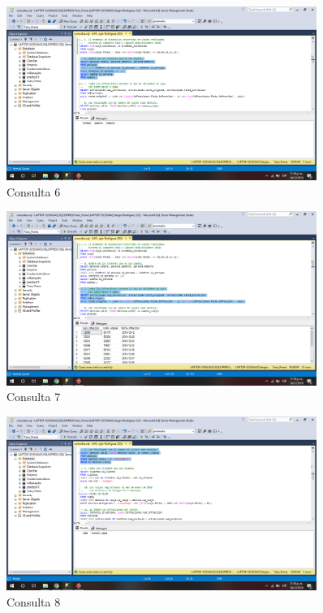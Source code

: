 \documentclass{article}
\begin{document}
\begin{figure}[h]
            \centering
            \includegraphics[width=0.9\textwidth]{img/58.png}
            \caption{Consulta 6}
            \label{fig:my_label6}
        \end{figure}
        
\begin{figure}[h]
            \centering
            \includegraphics[width=0.9\textwidth]{img/59.png}
            \caption{Consulta 7}
            \label{fig:my_label7}
        \end{figure}
        
\begin{figure}[h]
            \centering
            \includegraphics[width=0.9\textwidth]{img/60.png}
            \caption{Consulta 8}
            \label{fig:my_label8}
        \end{figure}
        
\end{document}
